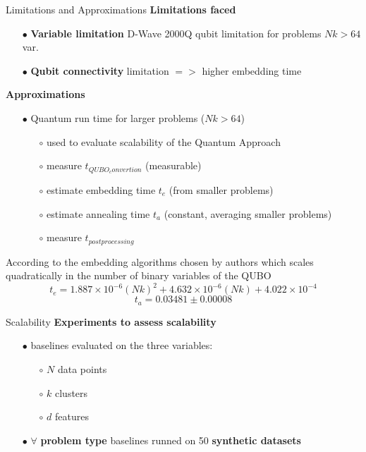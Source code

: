 		\begin{frame}[allowframebreaks]{Limitations and Approximations}
			\textbf{Limitations faced}
			\begin{itemize}
				\item[$\bullet$] \textbf{Variable limitation} D-Wave 2000Q qubit limitation for problems $Nk > 64$ var.
				\item[$\bullet$] \textbf{Qubit connectivity} limitation $=>$ higher embedding time
			\end{itemize}
			\textbf{Approximations}
			\begin{itemize}
				\item[$\bullet$] Quantum run time for larger problems ($Nk > 64$)
				\begin{itemize}
					\item[$\circ$] used to evaluate scalability of the Quantum Approach
					\item[$\circ$] measure $t_{QUBO_convertion}$ (measurable)
					\item[$\circ$] estimate embedding time $t_{e}$ (from smaller problems)
					\item[$\circ$] estimate annealing time $t_{a}$ (constant, averaging smaller problems) 
					\item[$\circ$] measure $t_{postprocessing}$
				\end{itemize} 
			\end{itemize}
			According to the embedding algorithms chosen by authors which scales quadratically in the number of binary variables of the QUBO
			\begin{equation}
				t_{e} = 1.887 \times 10^{-6}(Nk)^2 
				+ 4.632 \times 10^{-6}(Nk)
				+ 4.022 \times 10^{-4}
			\end{equation}
			\begin{equation}
				t_{a} = 0.03481 \pm 0.00008
			\end{equation}
		\end{frame}

		\begin{frame}{Scalability}
			\textbf{Experiments to assess scalability}
			\begin{itemize}
				\item[$\bullet$] baselines evaluated on the three variables:
				\begin{itemize}
					\item[$\circ$] $N$ data points  					
					\item[$\circ$] $k$ clusters
					\item[$\circ$] $d$ features 
				\end{itemize}
				\item[$\bullet$] $\forall$ \textbf{problem type} baselines runned on 50 \textbf{synthetic datasets}
			\end{itemize}
		\end{frame}

